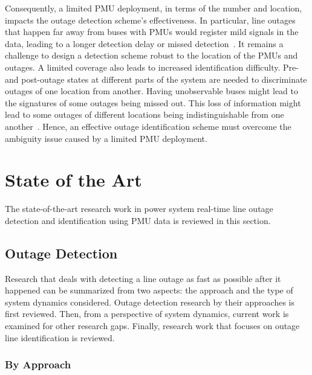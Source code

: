 Consequently, a limited PMU deployment, in terms of the number and location, impacts the outage detection scheme’s effectiveness. In particular, line outages that happen far away from buses with PMUs would register mild signals in the data, leading to a longer detection delay or missed detection~\cite{yang2020control}. It remains a challenge to design a detection scheme robust to the location of the PMUs and outages. 
A limited coverage also leads to increased identification difficulty. Pre- and post-outage states at different parts of the system are needed to discriminate outages of one location from another. Having unobservable buses might lead to the signatures of some outages being missed out. This loss of information might lead to some outages of different locations being indistinguishable from one another~\cite{Wu2015,Costilla-Enriquez2019,yang2021particle}. Hence, an effective outage identification scheme must overcome the ambiguity issue caused by a limited PMU deployment.



\section{State of the Art}

The state-of-the-art research work in power system real-time line outage detection and identification using PMU data is reviewed in this section. 

\subsection{Outage Detection} %
\label{sub:outage_detection}

Research that deals with detecting a line outage as fast as possible after it happened can be summarized from two aspects: the approach and the type of system dynamics considered. Outage detection research by their approaches is first reviewed. Then, from a perspective of system dynamics, current work is examined for other research gaps. Finally, research work that focuses on outage line identification is reviewed.

\subsubsection{By Approach} %
\label{ssub:by_approach}

